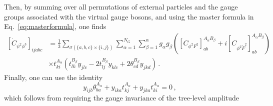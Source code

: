 Then, by summing over all permutations of external particles and the gauge groups associated
with the virtual gauge bosons, and using the master formula in
Eq.~\eqref{eq:masterformula}, one finds
\begin{align}
    \left[\dot C_{\psi^2\phi^3}\right]_{ijabc} &= \frac{1}{3}\sum_{\sigma(\{a,b,c\}\times\{i,j\})}
    \sum_{\alpha=1}^{N_G}\sum_{\beta=1}^\alpha g_\alpha g_\beta
    \left(\left[C_{\phi^2F^2}\right]^{A_\alpha B_\beta}_{ab}
    + i \left[C_{\phi^2\widetilde F^2}\right]^{A_\alpha B_\beta}_{ab} \right) \nonumber \\
    &\times t^{A_\alpha}_{ki}\left(t^{B_\beta}_{lk}y_{jlc}-2t^{B_\beta}_{lj}y_{klc}
    +2\theta^{B_\beta}_{cd}y_{jkd}\right)\,.\label{eq:partres}
\end{align}
Finally, one can use the identity
\begin{equation}
    y_{ijb}\theta^{A_\alpha}_{ba}  + y_{ika}t^{A_\alpha}_{kj} + y_{jka}t^{A_\alpha}_{ki} = 0\,,
    \label{eq:gaugeinvid}
\end{equation}
which follows from requiring the gauge invariance of the tree-level amplitude
